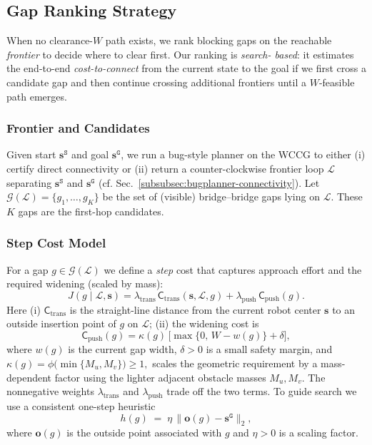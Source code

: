 \subsection{Gap Ranking Strategy}
\label{subsec:gap}

When no clearance-$W$ path exists, we rank blocking gaps on the reachable
\emph{frontier} to decide where to clear first. Our ranking is \emph{search-
based}: it estimates the end-to-end \emph{cost-to-connect} from the current
state to the goal if we first cross a candidate gap and then continue crossing
additional frontiers until a $W$-feasible path emerges.

\subsubsection{Frontier and Candidates}
\label{subsubsec:gap-frontier}
Given start $\mathbf{s}^{\texttt{S}}$ and goal $\mathbf{s}^{\texttt{G}}$, we run
a bug-style planner on the WCCG to either (i) certify direct connectivity or
(ii) return a counter-clockwise frontier loop $\mathcal{L}$ separating
$\mathbf{s}^{\texttt{S}}$ and $\mathbf{s}^{\texttt{G}}$ (cf. Sec.~\ref{subsubsec:bugplanner-connectivity}).
Let $\mathcal{G}(\mathcal{L})=\{g_1,\ldots,g_K\}$ be the set of (visible)
bridge–bridge gaps lying on $\mathcal{L}$. These $K$ gaps are the first-hop
candidates.

\subsubsection{Step Cost Model}
\label{subsubsec:gap-cost}
For a gap $g\in\mathcal{G}(\mathcal{L})$ we define a \emph{step} cost that
captures approach effort and the required widening (scaled by mass):
\begin{equation}\label{eq:step-cost}
J(g\mid\mathcal{L},\mathbf{s})
= \lambda_{\mathrm{trans}}\,\mathsf{C}_{\mathrm{trans}}(\mathbf{s},\mathcal{L},g)
+ \lambda_{\mathrm{push}}\,\mathsf{C}_{\mathrm{push}}(g).
\end{equation}
Here (i) $\mathsf{C}_{\mathrm{trans}}$ is the straight-line distance from the
current robot center $\mathbf{s}$ to an outside insertion point of $g$ on
$\mathcal{L}$; (ii) the widening cost is
\begin{equation}\label{eq:push-cost}
\mathsf{C}_{\mathrm{push}}(g)
= \kappa(g)\,\big[\max\{0,\,W-w(g)\}+\delta\big],
\end{equation}
where $w(g)$ is the current gap width, $\delta>0$ is a small safety margin, and
$\kappa(g)=\phi\!\big(\min\{M_u,M_v\}\big)\ge 1,$ scales the geometric requirement by a mass-dependent factor using
the lighter adjacent obstacle masses $M_u,M_v$. The nonnegative weights
$\lambda_{\mathrm{trans}}$ and $\lambda_{\mathrm{push}}$ trade off the two terms.
To guide search we use a consistent one-step heuristic
\begin{equation}\label{eq:gap-heuristic}
  h(g) \;=\; \eta \,\big\|\mathbf{o}(g)-\mathbf{s}^{\texttt{G}}\big\|_2,
\end{equation}
where $\mathbf{o}(g)$ is the outside point associated with $g$ and
$\eta>0$ is a scaling factor.

